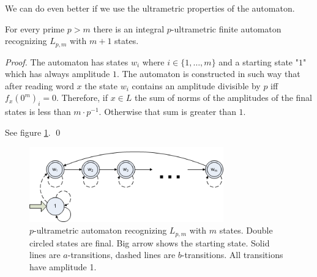 \documentclass{llncs}
\begin{document}
We can do even better if we use the ultrametric properties of the automaton.

\begin{theorem}
For every prime $p > m$ there is an integral $p$-ultrametric finite automaton recognizing $L_{p,m}$ with $m+1$ states.
\end{theorem}
\begin{proof}
The automaton has states $w_i$ where $i \in \{1, \ldots, m\}$ and a starting state "$1$" which has always amplitude $1$.
The automaton is constructed in such way that after reading word $x$ the state $w_i$ contains an amplitude divisible by $p$ iff $f_x(0^m)_i = 0$.
Therefore, if $x \in L$ the sum of norms of the amplitudes of the final states is less than $m \cdot p^{-1}$. Otherwise that sum is greater than $1$.

See figure \ref{autom2}.
\qed
\end{proof}


\begin{figure}[H]
  \centering
  \includegraphics[width = 8.4cm]{autom_m1.png}
  \caption{$p$-ultrametric automaton recognizing $L_{p,m}$ with $m$ states.
  Double circled states are final.
  Big arrow shows the starting state.
  Solid lines are $a$-transitions, dashed lines are $b$-transitions.
  All transitions have amplitude 1. }
  \label{autom2}
\end{figure}
\end{document}
